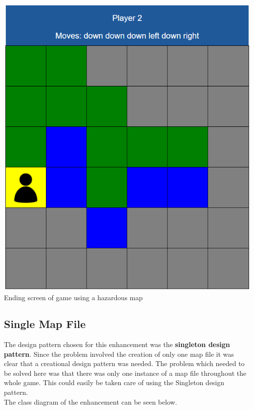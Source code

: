 \documentclass[a4paper,12pt]{extarticle}
\begin{document}
\begin{center}
\includegraphics[scale=0.5]{Figure3.png}\\
Ending screen of game using a hazardous map
\end{center}

\newpage

\subsection{Single Map File}

The design pattern chosen for this enhancement was the \textbf{singleton design pattern}. Since the problem involved the creation of only one map file it was clear that a creational design pattern was needed. The problem which needed to be solved here was that there was only one instance of a map file throughout the whole game. This could easily be taken care of using the Singleton design pattern.\\

\noindent The class diagram of the enhancement can be seen below.\\
\end{document}

